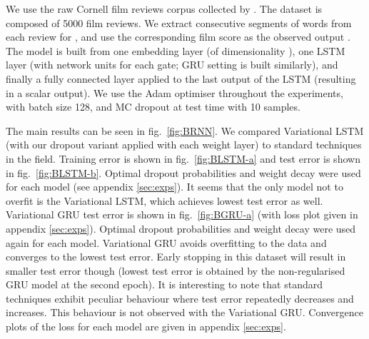 \documentclass{article}
\theoremstyle{definition}
\begin{document}
We use the raw Cornell film reviews corpus collected by \citet{pang2005seeing}.
The dataset is composed of 5000 film reviews.
We extract consecutive segments of  words from each review for , and use the corresponding film score as the observed output . The model is built from one embedding layer (of dimensionality ), one LSTM layer (with  network units for each gate; GRU setting is built similarly), and finally a fully connected layer applied to the last output of the LSTM (resulting in a scalar output).
We use the Adam optimiser \citep{kingma2014adam} throughout the experiments, with batch size 128, and MC dropout at test time with 10 samples. 

The main results can be seen in fig.\ \ref{fig:BRNN}. 
We compared Variational LSTM (with our dropout variant applied with each weight layer) to standard techniques in the field. Training error is shown in fig.\ \ref{fig:BLSTM-a} and test error is shown in fig.\ \ref{fig:BLSTM-b}.
Optimal dropout probabilities and weight decay were used for each model (see appendix \ref{sec:exps}). 
It seems that the only model not to overfit is the Variational LSTM, which achieves lowest test error as well. 
Variational GRU test error is shown in fig.\ \ref{fig:BGRU-a} (with loss plot given in appendix \ref{sec:exps}).
Optimal dropout probabilities and weight decay were used again for each model. 
Variational GRU avoids overfitting to the data and converges to the lowest test error. Early stopping in this dataset will result in smaller test error though (lowest test error is obtained by the non-regularised GRU model at the second epoch). It is interesting to note that standard techniques exhibit peculiar behaviour where test error repeatedly decreases and increases. This behaviour is not observed with the Variational GRU. 
Convergence plots of the loss for each model are given in appendix \ref{sec:exps}.
\end{document}
